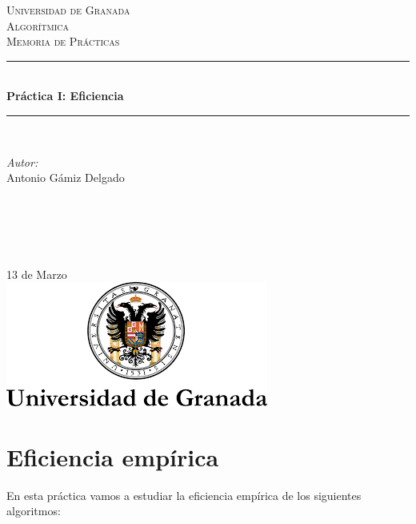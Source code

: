 \documentclass[12pt]{article}
\begin{document}
\begin{titlepage}
\newcommand{\HRule}{\rule{\linewidth}{0.5mm}}
\center
\textsc{\LARGE Universidad de Granada}\\[1.5cm] %
\textsc{\Large Algorítmica}\\[0.5cm] %
\textsc{\large Memoria de Prácticas}\\[0.5cm] %
\HRule \\[0.4cm]
{ \huge \bfseries Práctica I: Eficiencia}\\[0.4cm] %
\HRule \\[1.5cm]
\begin{minipage}{0.4\textwidth}
\begin{flushleft} \large
\emph{Autor:}\\
Antonio Gámiz Delgado \textsc{} %
\end{flushleft}
\end{minipage}
~
\begin{minipage}{0.4\textwidth}
\begin{flushright} \large
\emph{} \\
\textsc{} %
\end{flushright}
\end{minipage}\\[2cm]
{\large 13 de Marzo}\\[2cm] %
\includegraphics{logo.png}\\[1cm]
\vfill %
\end{titlepage}

%

\section{Eficiencia empírica}

En esta práctica vamos a estudiar la eficiencia empírica de los siguientes algoritmos:
\end{document}
